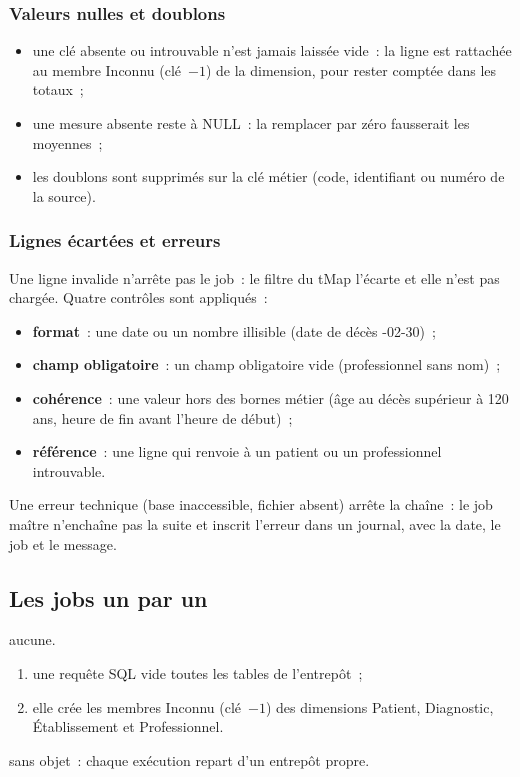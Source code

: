 \subsubsection*{Valeurs nulles et doublons}
\begin{itemize}
	\item une clé absente ou introuvable n'est jamais laissée vide~: la ligne est rattachée au membre \og Inconnu\fg{} (clé~$-1$) de la dimension, pour rester comptée dans les totaux~;
	\item une mesure absente reste à NULL~: la remplacer par zéro fausserait les moyennes~;
	\item les doublons sont supprimés sur la clé métier (code, identifiant ou numéro de la source).
\end{itemize}

\subsubsection*{Lignes écartées et erreurs}
\noindent Une ligne invalide n'arrête pas le job~: le filtre du tMap l'écarte et elle n'est pas chargée. Quatre contrôles sont appliqués~:
\begin{itemize}
	\item \textbf{format}~: une date ou un nombre illisible (date de décès -02-30\fg{})~;
	\item \textbf{champ obligatoire}~: un champ obligatoire vide (professionnel sans nom)~;
	\item \textbf{cohérence}~: une valeur hors des bornes métier (âge au décès supérieur à 120 ans, heure de fin avant l'heure de début)~;
	\item \textbf{référence}~: une ligne qui renvoie à un patient ou un professionnel introuvable.
\end{itemize}
\noindent Une erreur technique (base inaccessible, fichier absent) arrête la chaîne~: le job maître n'enchaîne pas la suite et inscrit l'erreur dans un journal, avec la date, le job et le message.

\subsection{Les jobs un par un}\label{sec:etl-jobs}

  {aucune.}
  {
  \begin{enumerate}
	\item une requête SQL vide toutes les tables de l'entrepôt~;
	\item elle crée les membres \og Inconnu\fg{} (clé~$-1$) des dimensions Patient, Diagnostic, Établissement et Professionnel.
  \end{enumerate}}
  {sans objet~: chaque exécution repart d'un entrepôt propre.}

